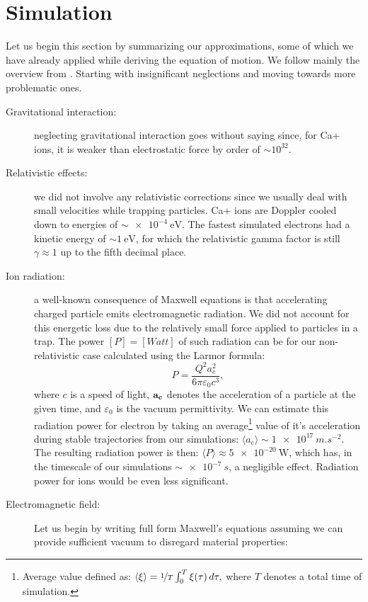 \section{Simulation}
\label{sec:simulation}
Let us begin this section by summarizing our approximations, some of which we have already applied while deriving the equation of motion. We follow mainly the overview from \cite{Friedman_1982}. Starting with insignificant neglections and moving towards more problematic ones. 
\begin{description}
	\item[Gravitational interaction:] neglecting gravitational interaction goes without saying since, for Ca+ ions, it is weaker than electrostatic force by order of $\sim 10^{32}$.
	\item[Relativistic effects:] we did not involve any relativistic corrections since we usually deal with small velocities while trapping particles. Ca+ ions are Doppler cooled down to energies of $\sim \SI{e-4}{\eV}$. The fastest simulated electrons had a kinetic energy of $\sim \SI{1}{\eV}$, for which the relativistic gamma factor is still $\gamma \approx  1$ up to the fifth decimal place.
	\item[Ion radiation:] a well-known consequence of Maxwell equations is that accelerating charged particle emits electromagnetic radiation. We did not account for this energetic loss due to the relatively small force applied to particles in a trap. The power $[P] = [Watt]$ of such radiation can be for our non-relativistic case calculated using \cite{larmor1897lxiii} the Larmor formula: $$P = \dfrac{Q^2 a_c^2}{6 \pi \varepsilon_0 c^3},$$ where $c$ is a speed of light, $\vb{a_c}$ denotes the acceleration of a particle at the given time, and $\varepsilon_0$ is the vacuum permittivity. We can estimate this radiation power for electron by taking an average\footnote{Average value defined as: $\langle \xi \rangle = \nicefrac{1}{T} \int_{0}^{T} \xi(\tau) \, d\tau,$ where $T$ denotes a total time of simulation.} value of it's acceleration during stable trajectories from our simulations: $\langle a_c \rangle \sim \SI{1e17}{m.s^{-2}}$. The resulting radiation power is then: $\langle P \rangle \approx \SI{5e-20}{\watt}$, which has, in the timescale of our simulations $\sim \SI{e-7}{s}$, a negligible effect. Radiation power for ions would be even less significant.
	\item[Electromagnetic field:] Let us begin by writing full form Maxwell's equations assuming we can provide sufficient vacuum to disregard material properties:

\end{description}
